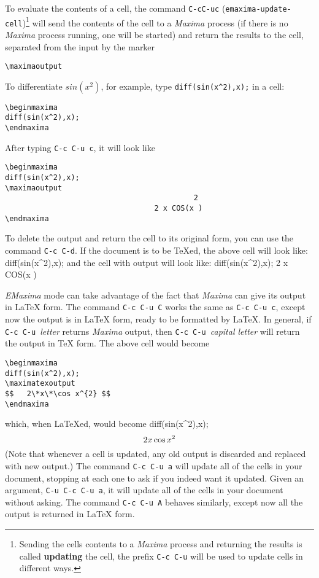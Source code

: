 \documentclass{article}
\newcommand{\emx}{\textsl{\sffamily EMaxima}}
\newcommand{\mx}{\textsl{\sffamily Maxima}}
\begin{document}
\noindent
To evaluate the contents of a cell, the command
\texttt{C-cC-uc} (\texttt{emaxima-update-cell})\footnote{Sending the
  cells contents to a \mx{} process and returning the results is
  called \textbf{updating} the cell, the prefix 
\texttt{C-c C-u} will be used to update cells in different ways.} 
will send the contents
of the cell to a \mx{} process (if there is no \mx{} process running,
one will be started) and return the results to the cell,
separated from the input by the marker
\begin{verbatim}
\maximaoutput
\end{verbatim}
\noindent
To differentiate
$sin(x^2)$, for example, type 
\texttt{diff(sin(x\^{}2),x);} in a cell:
\begin{verbatim}
\beginmaxima
diff(sin(x^2),x);
\endmaxima
\end{verbatim}
\noindent
After typing \texttt{C-c C-u c}, it will look like
\begin{verbatim}
\beginmaxima
diff(sin(x^2),x);
\maximaoutput
                                           2
                                  2 x COS(x )
\endmaxima
\end{verbatim}
\noindent
To delete the output and return the cell to its original form, you can
use the command \texttt{C-c C-d}.
If the document is to be \TeX{}ed, the above cell will look like:
\beginmaxima
diff(sin(x^2),x);
\endmaxima
and the cell with output will look like:
\beginmaxima
diff(sin(x^2),x);
                                  2 x COS(x )
\endmaxima

\emx{} mode can take advantage of the fact that \mx{} can give its
output in \LaTeX{} form.  The command \texttt{C-c C-u C}
works the same as \texttt{C-c C-u c}, except now the output is in \LaTeX{}
form, ready to be formatted by \LaTeX{}.  In general, if 
\texttt{C-c C-u }\textsl{letter} returns \mx{} output, then
\texttt{C-c C-u }\textsl{capital letter} will return the output in
\TeX{} form.  The above cell would become
\begin{verbatim}
\beginmaxima
diff(sin(x^2),x);
\maximatexoutput
$$   2\*x\*\cos x^{2} $$
\endmaxima
\end{verbatim}
\noindent
which, when \LaTeX{}ed, would become
\beginmaxima
diff(sin(x^2),x);
\maximatexoutput
$$   2\*x\*\cos x^{2} $$
\endmaxima
\noindent
(Note that whenever a cell is updated, any old output is discarded and
replaced with new output.)  The command \texttt{C-c C-u a} will update all
of the cells in your document, 
stopping at each one to ask if you indeed want it updated.  Given an
argument, \texttt{C-u C-c C-u a}, it will update all of the cells in your
document without asking.  The command \texttt{C-c C-u A} behaves
similarly, except now all the output is returned in \LaTeX{}  form.
\end{document}

